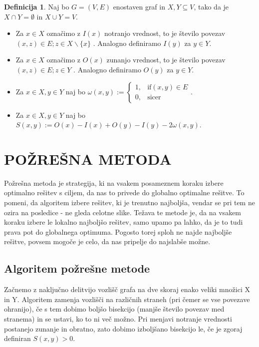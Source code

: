 \documentclass[12pt,a4paper]{amsart}
\theoremstyle{definition} %
\newtheorem{definicija}{Definicija}[section]
\theoremstyle{plain} %
\begin{document}
\begin{definicija}
Naj bo $G=(V,E)$ enostaven graf in $X,Y \subseteq V$, tako da je $X \cap Y = \emptyset$ in $X \cup Y =V$.
\begin{itemize}
\item Za $x \in X$ označimo z $I(x)$ notranjo vrednost, to je število povezav $(x,z) \in E;z\in X \backslash \{x\}$ . Analogno definiramo $I(y)$ za $y \in Y$.
\item Za $x \in X$ označimo z $O(x)$ zunanjo vrednost, to je število povezav $(x,z) \in E;z\in Y $ . Analogno definiramo $O(y)$ za $y \in Y$.
\item Za $x \in X, y \in Y$ naj bo $\omega(x,y) := \begin{cases} 1,&\text{if} (x,y) \in E\\ 
0, &\text{sicer}\end{cases} $.
\item Za $x \in X, y \in Y$ naj bo $S(x,y):= O(x)-I(x)+O(y)-I(y)-2\omega(x,y)$.
\end{itemize}
\end{definicija}
\bigbreak

\section{\textbf{POŽREŠNA METODA}}
Požrešna metoda je strategija, ki na vsakem posameznem koraku izbere optimalno rešitev s ciljem, da nas to privede do globalno optimalne rešitve. To pomeni, da algoritem izbere rešitev, ki je trenutno najboljša, vendar se pri tem ne ozira na posledice - ne gleda celotne slike. Težava te metode je, da na vsakem koraku izbere le lokalno najboljšo rešitev, samo upamo pa lahko, da je to tudi prava pot do globalnega optimuma. Pogosto torej sploh ne najde najboljše rešitve, povsem mogoče je celo, da nas pripelje do najslabše možne. \\

\subsection{Algoritem požrešne metode}
Začnemo z naključno delitvijo vozlišč grafa na dve skoraj enako veliki množici X in Y. Algoritem zamenja vozlišči na različnih straneh (pri čemer se vse povezave ohranijo), če s tem dobimo boljšo bisekcijo (manjše število povezav med stranema) in se ustavi, ko to ni več možno. Pri menjavi notranje vrednosti postanejo zunanje in obratno, zato dobimo izboljšano bisekcijo le, če je zgoraj definiran $S(x,y)>0$. \\
\end{document}
